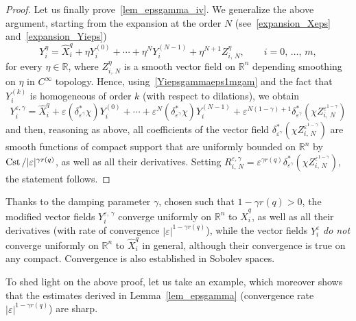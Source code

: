 \documentclass[10pt]{amsart}
\theoremstyle{definition}\newtheorem{defi}[theo]{Definition}\newtheorem{rema}[theo]{Remark}\newtheorem{exam}[theo]{Example}\newtheorem{exem}[theo]{Example}\newtheorem{nota}[theo]{Notation}
\newcommand*\R{\mathbb{R}}
\DeclareMathOperator{\Cst}{Cst}
\begin{document}
\begin{proof}
Let us finally prove~\eqref{lem_epsgamma_iv}. We generalize the above argument, starting from the expansion at the order $N$ (see~\eqref{expansion_Xeps} and~\eqref{expansion_Yieps})
\[
Y_i^\eta = \widehat{X}_i^{q} + \eta Y_i^{(0)} + \cdots + \eta^N Y_i^{(N-1)} + \eta^{N+1} Z_{i,\,N}^\eta,\qquad i=0,\,\ldots,\,m,
\]
for every $\eta\in\R$, where $Z_{i,\,N}^\eta$ is a smooth vector field on $\R^n$ depending smoothing on $\eta$ in $C^\infty$ topology. Hence, using~\eqref{Yiepsgammaeps1mgam} and the fact that $Y_i^{(k)}$ is homogeneous of order $k$ (with respect to dilations), we obtain
\[
Y_i^{\varepsilon,\gamma} = \widehat{X}_i^{q} + \varepsilon \left(\delta_{\varepsilon^\gamma}^* \chi\right) Y_i^{(0)} + \cdots + \varepsilon^N \left(\delta_{\varepsilon^\gamma}^* \chi\right) Y_i^{(N-1)} + \varepsilon^{N(1-\gamma)+1} \delta_{\varepsilon^\gamma}^* \left(\chi Z_{i,\,N}^{\varepsilon^{1-\gamma}} \right)
\]
and then, reasoning as above, all coefficients of the vector field $\delta_{\varepsilon^\gamma}^* (\chi Z_{i,\,N}^{\varepsilon^{1-\gamma}})$ are smooth functions of compact support that are uniformly bounded on $\R^n$ by $\Cst/\linebreak\vert\varepsilon\vert^{\gamma r(q)}$, as well as all their derivatives. Setting $R_{i,\,N}^{\varepsilon,\gamma} = \varepsilon^{\gamma r(q)} \delta_{\varepsilon^\gamma}^*(\chi Z_{i,\,N}^{\varepsilon^{1-\gamma}})$, the statement follows.
\end{proof}

Thanks to the damping parameter $\gamma$, chosen such that $1-\gamma r(q)>0$, the modified vector fields $Y^{\varepsilon,\,\gamma}_i$ converge uniformly on $\R^n$ to $\widehat{X}^{q}_i$, as well as all their derivatives (with rate of convergence $\vert\varepsilon\vert^{1-\gamma r(q)}$), while the vector fields $Y^\varepsilon_i$ \emph{do not} converge uniformly on $\R^n$ to $\widehat{X}^{q}_i$ in general, although their convergence is true on any compact. Convergence is also established in Sobolev spaces.

To shed light on the above proof, let us take an example, which moreover shows that the estimates derived in Lemma~\ref{lem_epsgamma} (convergence rate $\vert\varepsilon\vert^{1-\gamma r(q)}$) are sharp.
\end{document}
